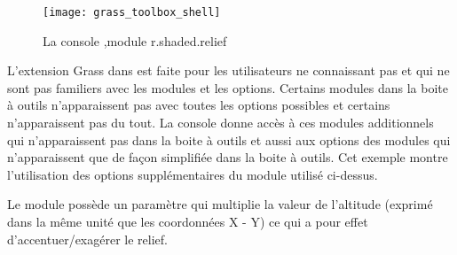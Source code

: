 {%
\begin{figure}[ht]
 \begin{center}
 \texttt{[image: grass\_toolbox\_shell]}
 \caption{La console \grass,module r.shaded.relief \nixcaption}\label{fig:grass_toolbox_shell}
 \end{center}
\end{figure}

L'extension Grass dans \qg est faite pour les utilisateurs ne connaissant pas \grass et qui ne sont pas familiers avec les modules et les options.
Certains modules dans la boite à outils n'apparaissent pas avec toutes les options possibles et certains n'apparaissent pas du tout. La console \grass donne accès à ces modules additionnels qui n'apparaissent pas dans la boite à outils et aussi aux options des modules qui n'apparaissent que de façon simplifiée dans la boite à outils. Cet exemple montre l'utilisation des options supplémentaires du module  utilisé ci-dessus.

Le module  possède un paramètre  qui multiplie la valeur de l'altitude (exprimé dans la même unité que les coordonnées X - Y) ce qui a pour effet d'accentuer/exagérer le relief.

}
